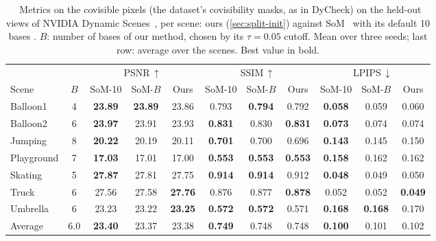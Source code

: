 \begin{table}[t]
  \centering
  \footnotesize
  \setlength{\tabcolsep}{4pt}
  \begin{tabular}{@{}lcccccccccc@{}}
    \toprule
     & & \multicolumn{3}{c}{PSNR\,$\uparrow$} & \multicolumn{3}{c}{SSIM\,$\uparrow$} & \multicolumn{3}{c}{LPIPS\,$\downarrow$} \\
    \cmidrule(lr){3-5} \cmidrule(lr){6-8} \cmidrule(l){9-11}
    Scene & $B$ & SoM-10 & SoM-$B$ & Ours & SoM-10 & SoM-$B$ & Ours & SoM-10 & SoM-$B$ & Ours \\
    \midrule
    Balloon1 & 4 & \textbf{23.89} & \textbf{23.89} & 23.86 & 0.793 & \textbf{0.794} & 0.792 & \textbf{0.058} & 0.059 & 0.060 \\
    Balloon2 & 6 & \textbf{23.97} & 23.91 & 23.93 & \textbf{0.831} & 0.830 & \textbf{0.831} & \textbf{0.073} & 0.074 & 0.074 \\
    Jumping & 8 & \textbf{20.22} & 20.19 & 20.11 & \textbf{0.701} & 0.700 & 0.696 & \textbf{0.143} & 0.145 & 0.150 \\
    Playground & 7 & \textbf{17.03} & 17.01 & 17.00 & \textbf{0.553} & \textbf{0.553} & \textbf{0.553} & \textbf{0.158} & 0.162 & 0.162 \\
    Skating & 5 & \textbf{27.87} & 27.81 & 27.75 & \textbf{0.914} & \textbf{0.914} & 0.912 & \textbf{0.048} & 0.049 & 0.050 \\
    Truck & 6 & 27.56 & 27.58 & \textbf{27.76} & 0.876 & 0.877 & \textbf{0.878} & 0.052 & 0.052 & \textbf{0.049} \\
    Umbrella & 6 & 23.23 & 23.22 & \textbf{23.25} & \textbf{0.572} & \textbf{0.572} & 0.571 & \textbf{0.168} & \textbf{0.168} & 0.170 \\
    \midrule
    Average & 6.0 & \textbf{23.40} & 23.37 & 23.38 & \textbf{0.749} & 0.748 & 0.748 & \textbf{0.100} & 0.101 & 0.102 \\
    \bottomrule
  \end{tabular}
  \caption{\claudetag\ Metrics on the covisible pixels (the dataset's covisibility masks, as in DyCheck) on the held-out views of NVIDIA Dynamic Scenes~\cite{yoon2020novel}, per scene: ours
    (\cref{sec:split-init}) against SoM~\cite{wang2025shape} with its default 10 bases . $B$: number of bases of our method, chosen by its $\tau = 0.05$ cutoff. Mean over three seeds; last row: average over the scenes.
    Best value in bold. }
  \label{tab:full-nvidia}
\end{table}
